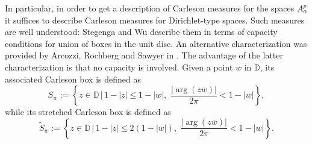\documentclass[12pt]{amsart}
\theoremstyle{definition}
\newcommand{\D}{\mathbb{{D}}}
\numberwithin{equation}{section}
\begin{document}
        In particular, in order to get a description of Carleson measures for the spaces $A^p_\alpha$ it suffices to describe Carleson measures for Dirichlet-type spaces. Such measures are well understood: Stegenga \cite{Stegenga80} and Wu \cite{Wu99} describe them in terms of capacity conditions for union of boxes in the unit disc. An alternative characterization was provided by Arcozzi, Rochberg and Sawyer in \cite[Thm. 1]{ARS02}. The advantage of the latter characterization is that no capacity is involved. Given a point $w$ in $\D$, its associated Carleson box is defined as
            \[
                S_w:=\left\{z\in\D\,\bigg|\, 1-|z|\leq 1-|w|,\,\, \frac{|\arg(z\overline w)|}{2\pi}<1-|w|\right\},
            \]
            while its stretched Carleson box is defined as
                \[
                    \tilde S_w:=\left\{z\in\D\,\bigg|\, 1-|z|\leq 2(1-|w|),\,\, \frac{|\arg(z\overline w)|}{2\pi}<1-|w|\right\}.
                \]
\end{document}
